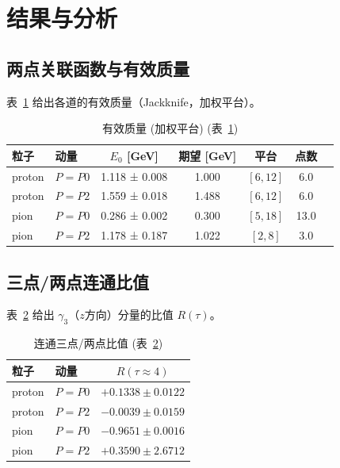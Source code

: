 \documentclass[11pt,a4paper]{article}
\begin{document}
\section{结果与分析}
\subsection{两点关联函数与有效质量}
表~\ref{tab:meff} 给出各道的有效质量（Jackknife，加权平台）。
\begin{table}[h]
\centering
\caption{有效质量 (加权平台) (表~\ref{tab:meff})}
\label{tab:meff}
\begin{tabular}{llccccl}
\toprule
粒子 & 动量 & $E_0$ [GeV] & 期望 [GeV] & 平台 & 点数 \\
\midrule
    proton & $P={P0}$ & 1.118 ± 0.008 & 1.000 & $[6,12]$ & 6.0 \\
    proton & $P={P2}$ & 1.559 ± 0.018 & 1.488 & $[6,12]$ & 6.0 \\
    pion & $P={P0}$ & 0.286 ± 0.002 & 0.300 & $[5,18]$ & 13.0 \\
    pion & $P={P2}$ & 1.178 ± 0.187 & 1.022 & $[2,8]$ & 3.0 \\
\bottomrule
\end{tabular}
\end{table}

\subsection{三点/两点连通比值}
表~\ref{tab:ratio} 给出 $\gamma_3$（$z$方向）分量的比值 $R(\tau)$。
\begin{table}[h]
\centering
\caption{连通三点/两点比值 (表~\ref{tab:ratio})}
\label{tab:ratio}
\begin{tabular}{llc}
\toprule
粒子 & 动量 & $R(\tau{\approx}4)$ \\
\midrule
    proton & $P={P0}$ & $+0.1338 \pm 0.0122$ \\
    proton & $P={P2}$ & $-0.0039 \pm 0.0159$ \\
    pion & $P={P0}$ & $-0.9651 \pm 0.0016$ \\
    pion & $P={P2}$ & $+0.3590 \pm 2.6712$ \\
\bottomrule
\end{tabular}
\end{table}
\end{document}
